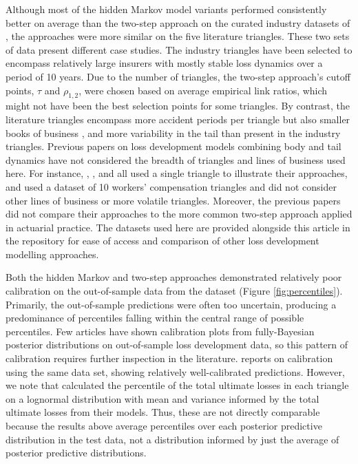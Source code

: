Although most of the hidden Markov model variants
performed consistently better on average
than the two-step
approach on the curated industry datasets
of \cite{meyers2015}, the approaches were
more similar on the five literature triangles.
These two sets of data present different
case studies. The industry triangles
have been selected to encompass relatively
large insurers with mostly stable
loss dynamics \citep[see][appendix A]{meyers2015}
over a period of 10 years.
Due to the number of triangles, the two-step
approach's cutoff points, $\tau$ and $\rho_{1,2}$,
were chosen based on average empirical link
ratios, which might not have been the best
selection points for some triangles.
By contrast, the literature triangles encompass
more accident periods per triangle but also smaller
books of business \citep[e.g. the medium-sized
triangles from][]{balona2022}, and
more variability in the tail than 
present in the industry triangles.
Previous papers on loss development models
combining body and tail dynamics
have not considered the breadth of triangles
and lines of business used here. For instance,
\cite{englandverrall2001}, \cite{verrall2012},
and \cite{verrall2015} all
used a single triangle to illustrate their approaches,
and 
\cite{zhang2012} used a dataset of
10 workers' compensation triangles and
did not consider other lines of business or
more volatile triangles. Moreover,
the previous papers did not compare
their approaches to the more common
two-step approach applied in actuarial
practice.
The datasets used here are provided alongside
this article in the repository
for ease of access
and comparison of other loss development
modelling approaches.

Both the hidden Markov and two-step
approaches demonstrated relatively poor
calibration on the out-of-sample
data from the \cite{meyers2015}
dataset (Figure \ref{fig:percentiles}). 
Primarily, 
the out-of-sample
predictions were often too
uncertain, producing a
predominance of percentiles falling
within the central range of
possible percentiles.
Few articles have shown calibration
plots from fully-Bayesian posterior
distributions on out-of-sample
loss development data, so this pattern of calibration requires
further inspection in the literature.
\cite{meyers2015} reports on 
calibration using the same data set,
showing relatively well-calibrated
predictions. However, we note
that \cite{meyers2015} calculated
the percentile of the total ultimate
losses in each triangle on a lognormal
distribution with mean and variance
informed by the total ultimate losses
from their models. Thus, these
are not directly comparable because
the results above average percentiles
over each posterior predictive distribution
in the test data, not a distribution informed
by just the average of posterior predictive
distributions.

